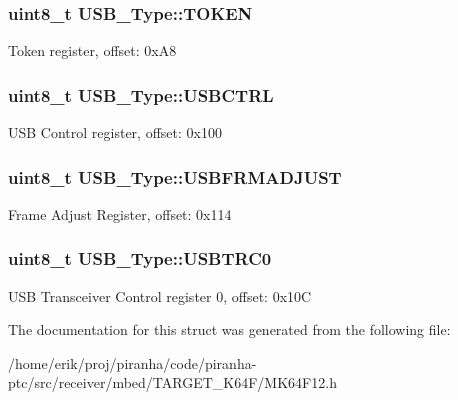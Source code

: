 \subsubsection[{\texorpdfstring{T\+O\+K\+EN}{TOKEN}}]{ uint8\+\_\+t U\+S\+B\+\_\+\+Type\+::\+T\+O\+K\+EN}\hypertarget{structUSB__Type_a58b9187d7f4a00613210eae025612065}{}\label{structUSB__Type_a58b9187d7f4a00613210eae025612065}
Token register, offset\+: 0x\+A8 
\subsubsection[{\texorpdfstring{U\+S\+B\+C\+T\+RL}{USBCTRL}}]{ uint8\+\_\+t U\+S\+B\+\_\+\+Type\+::\+U\+S\+B\+C\+T\+RL}\hypertarget{structUSB__Type_a7d0fdec2bab11d450d49677fc0bf729c}{}\label{structUSB__Type_a7d0fdec2bab11d450d49677fc0bf729c}
U\+SB Control register, offset\+: 0x100 
\subsubsection[{\texorpdfstring{U\+S\+B\+F\+R\+M\+A\+D\+J\+U\+ST}{USBFRMADJUST}}]{ uint8\+\_\+t U\+S\+B\+\_\+\+Type\+::\+U\+S\+B\+F\+R\+M\+A\+D\+J\+U\+ST}\hypertarget{structUSB__Type_a32e51e60eb32b6754162c3e4a9a054e1}{}\label{structUSB__Type_a32e51e60eb32b6754162c3e4a9a054e1}
Frame Adjust Register, offset\+: 0x114 
\subsubsection[{\texorpdfstring{U\+S\+B\+T\+R\+C0}{USBTRC0}}]{ uint8\+\_\+t U\+S\+B\+\_\+\+Type\+::\+U\+S\+B\+T\+R\+C0}\hypertarget{structUSB__Type_a0381c5afae0f997f54326c00e494d71c}{}\label{structUSB__Type_a0381c5afae0f997f54326c00e494d71c}
U\+SB Transceiver Control register 0, offset\+: 0x10C 

The documentation for this struct was generated from the following file\+:\begin{DoxyCompactItemize}
\item 
/home/erik/proj/piranha/code/piranha-\/ptc/src/receiver/mbed/\+T\+A\+R\+G\+E\+T\+\_\+\+K64\+F/M\+K64\+F12.\+h\end{DoxyCompactItemize}
